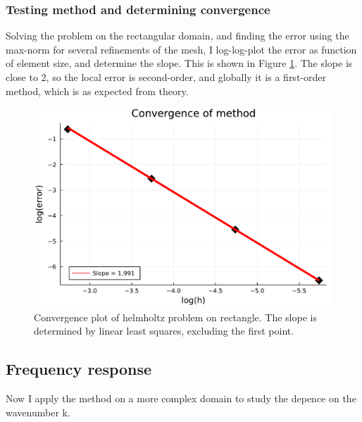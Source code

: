 \documentclass[aps, 12pt]{revtex4}
\begin{document}
\subsubsection{Testing method and determining convergence}
Solving the problem on the rectangular domain, and finding the error using the max-norm for several refinements of the mesh, I log-log-plot the error as function of element size, and determine the slope. This is shown in Figure \ref{fig:helmholtz_conv}. The slope is close to 2, so the local error is second-order, and globally it is a first-order method, which is as expected from theory.

\begin{figure}
    \includegraphics[width=\linewidth]{convergence_helmholtz.pdf}
    \caption{Convergence plot of helmholtz problem on rectangle. The slope is determined by linear least squares, excluding the first point.}
    \label{fig:helmholtz_conv}
\end{figure}

\subsection{Frequency response}
Now I apply the method on a more complex domain to study the depence on the wavenumber k.
\end{document}
